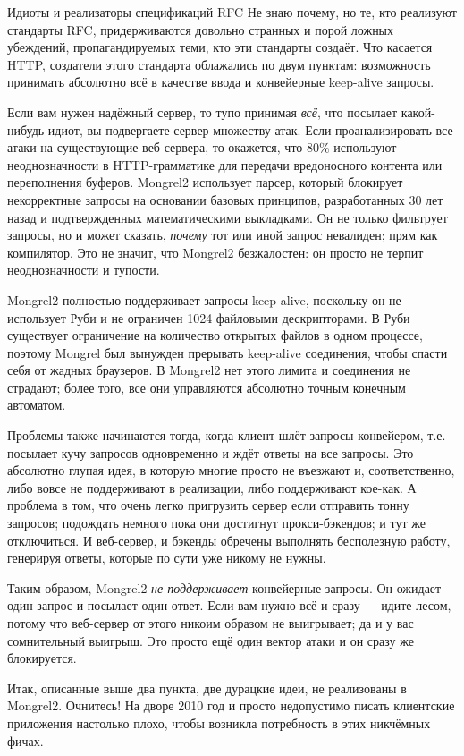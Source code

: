 \begin{aside}{Идиоты и реализаторы спецификаций RFC}
Не знаю почему, но те, кто реализуют стандарты RFC, придерживаются довольно
странных и порой ложных убеждений, пропагандируемых теми, кто эти стандарты
создаёт. Что касается HTTP, создатели этого стандарта облажались по двум
пунктам: возможность принимать абсолютно всё в качестве ввода и конвейерные
keep-alive запросы.

Если вам нужен надёжный сервер, то тупо принимая \emph{всё}, что посылает
какой-нибудь идиот, вы подвергаете сервер множеству атак. Если проанализировать
все атаки на существующие веб-сервера, то окажется, что 80\% используют
неоднозначности в HTTP-грамматике для передачи вредоносного контента или
переполнения буферов. Mongrel2 использует парсер, который блокирует некорректные
запросы на основании базовых принципов, разработанных 30 лет назад и
подтвержденных математическими выкладками. Он не только фильтрует запросы, но и
может сказать, \emph{почему} тот или иной запрос невалиден; прям как компилятор.
Это не значит, что Mongrel2 безжалостен: он просто не терпит неоднозначности и
тупости.

Mongrel2 полностью поддерживает запросы keep-alive, поскольку он не использует
Руби и не ограничен 1024 файловыми дескрипторами. В Руби существует ограничение
на количество открытых файлов в одном процессе, поэтому Mongrel был вынужден
прерывать keep-alive соединения, чтобы спасти себя от жадных браузеров. В
Mongrel2 нет этого лимита и соединения не страдают; более того, все они
управляются абсолютно точным конечным автоматом.

Проблемы также начинаются тогда, когда клиент шлёт запросы конвейером, т.е.
посылает кучу запросов одновременно и ждёт ответы на все запросы. Это абсолютно
глупая идея, в которую многие просто не въезжают и, соответственно, либо вовсе
не поддерживают в реализации, либо поддерживают кое-как. А проблема в том, что
очень легко пригрузить сервер если отправить тонну запросов; подождать немного
пока они достигнут прокси-бэкендов; и тут же отключиться. И веб-сервер, и бэкенды
обречены выполнять бесполезную работу, генерируя ответы, которые по сути уже
никому не нужны.

Таким образом, Mongrel2 \emph{не поддерживает} конвейерные запросы. Он ожидает
один запрос и посылает один ответ. Если вам нужно всё и сразу --- идите лесом,
потому что веб-сервер от этого никоим образом не выигрывает; да и у вас
сомнительный выигрыш. Это просто ещё один вектор атаки и он сразу же
блокируется.

Итак, описанные выше два пункта, две дурацкие идеи, не реализованы в Mongrel2.
Очнитесь! На дворе 2010 год и просто недопустимо писать клиентские приложения
настолько плохо, чтобы возникла потребность в этих никчёмных фичах.
\end{aside}

